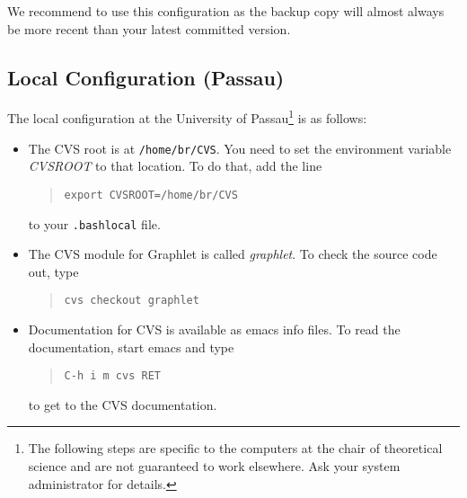 \noindent We recommend to use this configuration as the
backup copy will almost always be more recent than your latest
committed version.


\subsection{Local Configuration (Passau)}

The local configuration at the University of Passau\footnote{The
  following steps are specific to the computers at the chair of
  theoretical science and are not guaranteed to work elsewhere.
  Ask your system administrator for details.} is as follows:

\begin{itemize}

  \item The CVS root is at \texttt{/home/br/CVS}.  You need to set the 
  environment variable \emph{CVSROOT} to that location.  To do that, 
  add the line
  
  \begin{quote}
    \texttt{export CVSROOT=/home/br/CVS}
  \end{quote}

  to your \texttt{.bashlocal} file.

  \item The CVS module for Graphlet is called \emph{graphlet}.  To 
  check the source code out, type
  \begin{quote}
    \texttt{cvs checkout graphlet}
  \end{quote}

  \item Documentation for CVS is available as emacs info files.  To 
  read the documentation, start emacs and type
  \begin{quote}
    \texttt{C-h i m cvs RET}
  \end{quote}
  to get to the CVS documentation.

\end{itemize}



